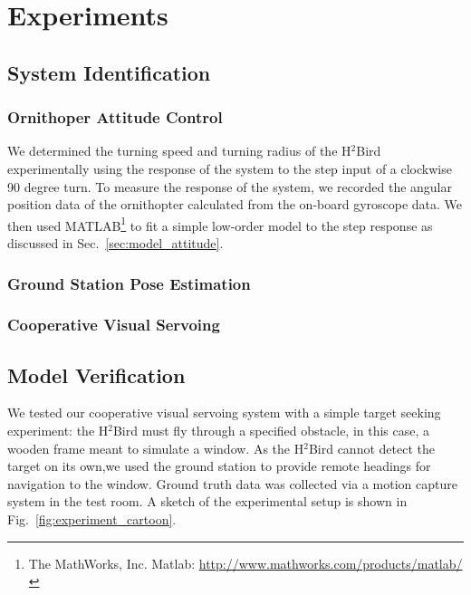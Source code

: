 \documentclass{aamas2013}
\begin{document}
\section{Experiments}

\subsection{System Identification}

\subsubsection{Ornithoper Attitude Control}

We determined the turning speed and turning radius of the H$^2$Bird
experimentally using the response of the system to the step input of a
clockwise 90 degree turn. To measure the response of the system, we recorded
the angular position data of the ornithopter calculated from the on-board
gyroscope data. We then used
MATLAB\footnote{The MathWorks, Inc. Matlab:
\href{http://www.mathworks.com/products/matlab/}
     {http://www.mathworks.com/products/matlab/}} to fit a
simple low-order model to the step response as discussed in Sec.~\ref{sec:model_attitude}.

\subsubsection{Ground Station Pose Estimation}

\subsubsection{Cooperative Visual Servoing}


\subsection{Model Verification}

We tested our cooperative visual servoing system with a simple target seeking
experiment: the H$^2$Bird must fly through a specified obstacle, in this case,
a wooden frame meant to simulate a window. As the H$^2$Bird cannot detect the
target on its own,we used the ground station to provide remote headings for
navigation to the window. Ground truth data was collected via a motion capture
system in the test room. A sketch of the experimental setup is shown in
Fig.~\ref{fig:experiment_cartoon}.
\end{document}
